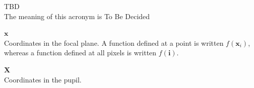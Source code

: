 \documentclass[12pt]{article}
\newcommand{\ib}{{\boldsymbol i}}
\newcommand{\Xb}{{\boldsymbol X}}
\newcommand{\xb}{{\boldsymbol x}}
\begin{document}
\begin{description}
  \item{TBD}\\
    The meaning of this acronym is To Be Decided

  \item{$\xb$}\\
    Coordinates in the focal plane.  A function defined at a point is written $f(\xb_i)$,
    whereas a function defined at all pixels is written $f(\ib)$.

  \item{$\Xb$}\\
    Coordinates in the pupil.
\end{description}


\printbibliography[heading=bibintoc]
\end{document}
